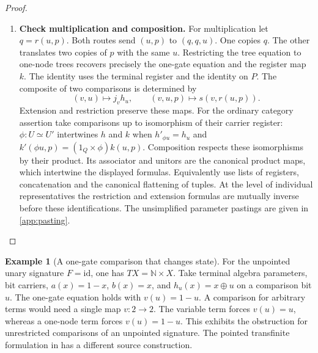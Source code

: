 \documentclass[11pt,a4paper]{article}
\theoremstyle{definition}
\newtheorem{example}[example]{Example}
\theoremstyle{remark}\newaliascnt{remark}{theorem}
\newcommand{\N}{\mathbb N}
\newcommand{\id}{\mathrm{id}}
\numberwithin{equation}{section}
\begin{document}
\begin{proof}
\begin{enumerate}[titledsteps]
    \item \textbf{Check multiplication and composition.} For multiplication let $q=r(u,p)$. Both routes send $(u,p)$ to $(q,q,u)$. One copies $q$. The other translates two copies of $p$ with the same $u$. Restricting the tree equation to one-node trees recovers precisely the one-gate equation and the register map $k$. The identity uses the terminal register and the identity on $P$. The composite of two comparisons is determined by
\[
 (v,u)\longmapsto j_vh_u,\qquad
 (v,u,p)\longmapsto s(v,r(u,p)).
\]
Extension and restriction preserve these maps. For the ordinary category assertion take comparisons up to isomorphism of their carrier register: $\phi:U\simeq U'$ intertwines $h$ and $k$ when $h'_{\phi u}=h_u$ and $k'(\phi u,p)=(1_Q\times\phi)k(u,p)$. Composition respects these isomorphisms by their product. Its associator and unitors are the canonical product maps, which intertwine the displayed formulas. Equivalently use lists of registers, concatenation and the canonical flattening of tuples. At the level of individual representatives the restriction and extension formulas are mutually inverse before these identifications. The unsimplified parameter pastings are given in \cref{app:pasting}.\qedhere
\end{enumerate}
\end{proof}

\begin{example}[A one-gate comparison that changes state]\label{ex:bit-obstruction}
For the unpointed unary signature $F=\id$, one has $TX=\N\times X$. Take terminal algebra parameters, bit carriers, $a(x)=1-x$, $b(x)=x$, and $h_u(x)=x\mathbin{\oplus}u$ on a comparison bit $u$. The one-gate equation holds with $v(u)=1-u$. A comparison for arbitrary terms would need a single map $v:2\to2$. The variable term forces $v(u)=u$, whereas a one-node term forces $v(u)=1-u$. This exhibits the obstruction for unrestricted comparisons of an unpointed signature. The pointed transfinite formulation in \cite[Conjecture G.12]{cdl} has a different source construction.
\end{example}
\end{document}
